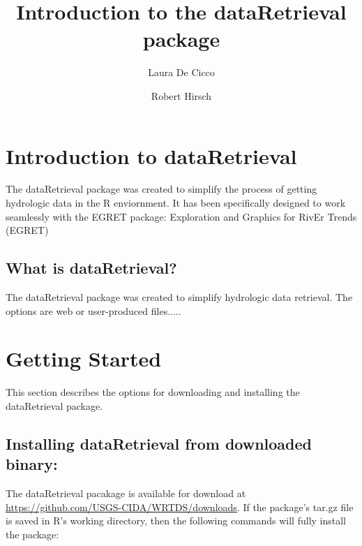 \documentclass[a4paper,11pt]{article}
\begin{document}


\title{Introduction to the dataRetrieval package}
\author[1]{Laura De Cicco}
\author[1]{Robert Hirsch}



\maketitle
\tableofcontents

\section{Introduction to dataRetrieval}
The dataRetrieval package was created to simplify the process of getting hydrologic data in the R enviornment. It has been specifically designed to work seamlessly with the EGRET package: Exploration and Graphics for RivEr Trends (EGRET) 

\subsection{What is dataRetrieval?}
The dataRetrieval package was created to simplify hydrologic data retrieval.  The options are web or user-produced files.....

\newpage
\section{Getting Started}
This section describes the options for downloading and installing the dataRetrieval package.
\subsection{Installing dataRetrieval from downloaded binary:}
The dataRetrieval pacakage is available for download at \url{https://github.com/USGS-CIDA/WRTDS/downloads}.  If the package's tar.gz file is saved in R's working directory, then the following commands will fully install the package:
\end{document}
